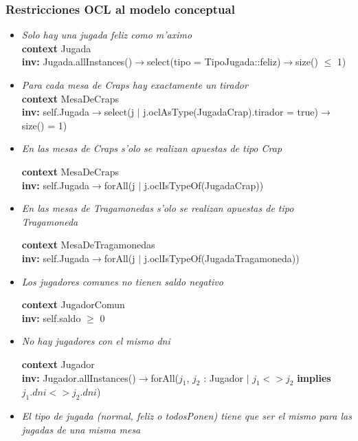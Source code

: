 \subsubsection{Restricciones OCL al modelo conceptual}
\begin{itemize}
 \item \textit{Solo hay una jugada feliz como m'aximo \\}
  \textbf{context} Jugada 
  \\ \textbf{inv:}
  Jugada.allInstances()$\rightarrow$select(tipo = TipoJugada::feliz)$\rightarrow$size() $\leq$ 1)


\item \textit{ Para cada mesa de Craps hay exactamente un tirador \\}
\textbf{context}  MesaDeCraps \\ \textbf{inv:} 
  self.Jugada$\rightarrow$select(j $|$ j.oclAsType(JugadaCrap).tirador = true)$\rightarrow$size() = 1)


\item \textit{En las mesas de Craps s'olo se realizan apuestas de tipo Crap} 

\textbf{context}  MesaDeCraps \\ \textbf{inv:} 
  self.Jugada$\rightarrow$forAll(j $|$ j.oclIsTypeOf(JugadaCrap))


\item \textit{En las mesas de Tragamonedas s'olo se realizan apuestas de tipo Tragamoneda}

\textbf{context}  MesaDeTragamonedas \\ \textbf{inv:} 
  self.Jugada$\rightarrow$forAll(j $|$ j.oclIsTypeOf(JugadaTragamoneda))

\item \textit{Los jugadores comunes no tienen saldo negativo}

\textbf{context}  JugadorComun \\ \textbf{inv:} 
  self.saldo $\geq$ 0

\item \textit{ No hay jugadores con el mismo dni}

\textbf{context}  Jugador \\ \textbf{inv:} 
  Jugador.allInstances()$\rightarrow$forAll($j_{1}$, $j_{2}$ : Jugador $|$ $j_{1} < > j_{2}$ \textbf{implies} $j_{1}.dni < > j_{2}.dni$)


\item\textit{ El tipo de jugada (normal, feliz o todosPonen) tiene que ser el mismo para las jugadas de una misma mesa}


\end{itemize}
